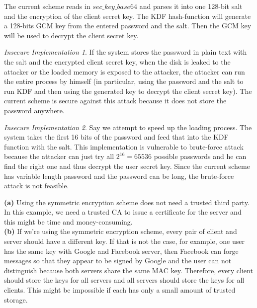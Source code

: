 \documentclass[12pt]{article}
\newenvironment{question}[2][Question]{\begin{trivlist}
\item[\hskip \labelsep {\bfseries #1}\hskip \labelsep {\bfseries #2.}]}{\end{trivlist}}
\begin{document}
\begin{question}{3} 
The current scheme reads in $sec\_key\_base64$ and parses it into one 128-bit salt and the encryption of the client secret key. The KDF hash-function will generate a 128-bits GCM key from the entered password and the salt. Then the GCM key will be used to decrypt the client secret key.

\emph{Insecure Implementation 1}. If the system stores the password in plain text with the salt and the encrypted client secret key, when the disk is leaked to the attacker or the loaded memory is exposed to the attacker, the attacker can run the entire process by himself (in particular, using the password and the salt to run KDF and then using the generated key to decrypt the client secret key). The current scheme is secure against this attack because it does not store the password anywhere.

\emph{Insecure Implementation 2}. Say we attempt to speed up the loading process. The system takes the first 16 bits of the password and feed that into the KDF function with the salt. This implementation is vulnerable to brute-force attack because the attacker can just try all $2^{16} = 65536$ possible passwords and he can find the right one and thus decrypt the user secret key. Since the current scheme has variable length password and the password can be long, the brute-force attack is not feasible.
\end{question}

\newpage

\begin{question}{4}
{\bf (a)} Using the symmetric encryption scheme does not need a trusted third party. In this example, we need a trusted CA to issue a certificate for the server and this might be time and money-consuming.
\\[5pt] 
{\bf (b)} If we're using the symmetric encryption scheme, every pair of client and server should have a different key. If that is not the case, for example, one user has the same key with Google and Facebook server, then Facebook can forge messages so that they appear to be signed by Google and the user can not distinguish because both servers share the same MAC key. Therefore, every client should store the keys for all servers and all servers should store the keys for all clients. This might be impossible if each has only a small amount of trusted storage.
\end{question}
\end{document}
